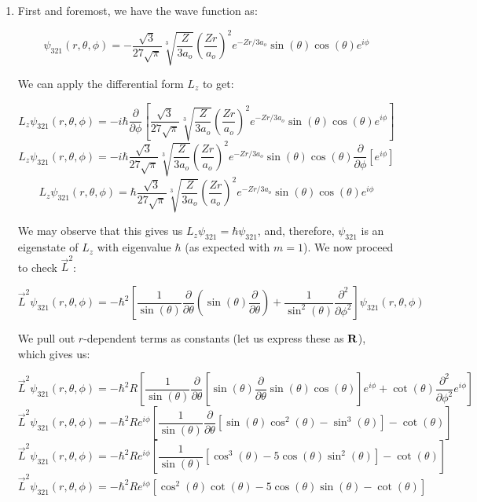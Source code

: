 \begin{enumerate}

  \item First and foremost, we have the wave function as:

    $$\psi_{321}(r,\theta,\phi)=-\frac{\sqrt{3}}{27\sqrt{\pi}}\sqrt[3]{\frac{Z}{3a_o}}\left( \frac{Zr}{a_o} \right)^2e^{-Zr/3a_o}\sin(\theta)\cos(\theta)e^{i\phi}$$

    We can apply the differential form $L_z$ to get:

    $$L_z\psi_{321}(r,\theta,\phi)=-i\hbar\frac{\partial}{\partial\phi}\left[\frac{\sqrt{3}}{27\sqrt{\pi}}\sqrt[3]{\frac{Z}{3a_o}}\left( \frac{Zr}{a_o} \right)^2e^{-Zr/3a_o}\sin(\theta)\cos(\theta)e^{i\phi}\right]$$
    $$L_z\psi_{321}(r,\theta,\phi)=-i\hbar\frac{\sqrt{3}}{27\sqrt{\pi}}\sqrt[3]{\frac{Z}{3a_o}}\left( \frac{Zr}{a_o} \right)^2e^{-Zr/3a_o}\sin(\theta)\cos(\theta)\frac{\partial}{\partial\phi}\left[e^{i\phi}\right]$$
    $$L_z\psi_{321}(r,\theta,\phi)=\hbar\frac{\sqrt{3}}{27\sqrt{\pi}}\sqrt[3]{\frac{Z}{3a_o}}\left( \frac{Zr}{a_o} \right)^2e^{-Zr/3a_o}\sin(\theta)\cos(\theta)e^{i\phi}$$

    We may observe that this gives us $L_z\psi_{321}=\hbar\psi_{321}$, and, therefore, $\psi_{321}$ is an eigenstate of $L_z$ with eigenvalue $\hbar$ (as expected with $m=1$). We now proceed to check $\vec{L}^2$:

    $$\vec{L}^2\psi_{321}(r,\theta,\phi)=-\hbar^2\left[\frac{1}{\sin(\theta)}\frac{\partial}{\partial\theta}\left( \sin(\theta)\frac{\partial}{\partial\theta} \right)+\frac{1}{\sin^2(\theta)}\frac{\partial^2}{\partial\phi^2}\right]\psi_{321}(r,\theta,\phi)$$

    We pull out $r$-dependent terms as constants (let us express these as $\bold{R}$), which gives us:

    $$\vec{L}^2\psi_{321}(r,\theta,\phi)=-\hbar^2R\left[ \frac{1}{\sin(\theta)}\frac{\partial}{\partial\theta}\left[ \sin(\theta)\frac{\partial}{\partial\theta} \sin(\theta)\cos(\theta) \right]e^{i\phi} +\cot(\theta)\frac{\partial^2}{\partial\phi^2} e^{i\phi}\right]$$
    $$\vec{L}^2\psi_{321}(r,\theta,\phi)=-\hbar^2Re^{i\phi}\left[ \frac{1}{\sin(\theta)}\frac{\partial}{\partial\theta}\left[ \sin(\theta)\cos^2(\theta)-\sin^3(\theta) \right]-\cot(\theta)\right]$$
    $$\vec{L}^2\psi_{321}(r,\theta,\phi)=-\hbar^2Re^{i\phi}\left[ \frac{1}{\sin(\theta)}\left[ \cos^3(\theta)-5\cos(\theta)\sin^2(\theta) \right]-\cot(\theta)\right]$$
    $$\vec{L}^2\psi_{321}(r,\theta,\phi)=-\hbar^2Re^{i\phi}\left[ \cos^2(\theta)\cot(\theta)-5\cos(\theta)\sin(\theta)-\cot(\theta)\right]$$


\end{enumerate}
